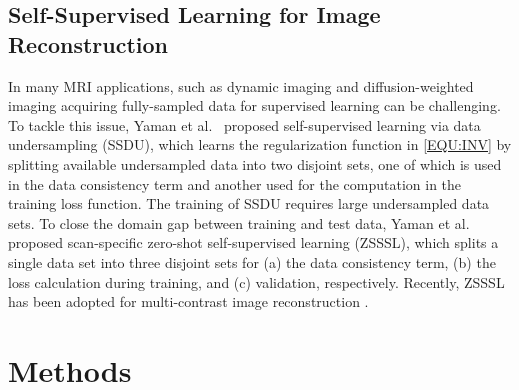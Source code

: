 \documentclass[journal,twoside,web]{ieeecolor}
\begin{document}

	\subsection{Self-Supervised Learning for Image Reconstruction}

	In many MRI applications, such as dynamic imaging and diffusion-weighted imaging
	acquiring fully-sampled data
	for supervised learning can be challenging.
	To tackle this issue, Yaman et al.~\cite{yaman_2020_ssdu}
	proposed self-supervised learning via data undersampling (SSDU),
	which learns the regularization function in \cref{EQU:INV}
	by splitting available undersampled data into two disjoint sets,
	one of which is used in the data consistency term and
	another used for the computation in the training loss function.
	The training of SSDU requires large undersampled data sets.
	To close the domain gap between training and test data,
	Yaman et al.~\cite{yaman_2022_zs} proposed
	scan-specific zero-shot self-supervised learning (ZSSSL),
	which splits a single data set into three disjoint sets
	for (a) the data consistency term, (b) the loss calculation during training,
	and (c) validation, respectively.
	Recently, ZSSSL has been adopted for multi-contrast image reconstruction
	\cite{heydari_2024_jmaple}.

	\section{Methods}
\end{document}
